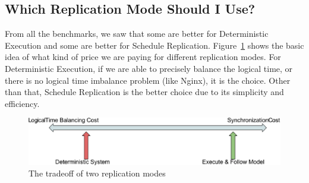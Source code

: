 \subsection{Which Replication Mode Should I Use?}
From all the benchmarks, we saw that some are better for Deterministic Execution and some are better for Schedule Replication. Figure~\ref{f:trade_off} shows the basic idea of what kind of price we are paying for different replication modes. For Deterministic Execution, if we are able to precisely balance the logical time, or there is no logical time imbalance problem (like Nginx), it is the choice. Other than that, Schedule Replication is the better choice due to its simplicity and efficiency.

\begin{figure}
\centering
\includegraphics[width=0.8\columnwidth]{figures/tradeoff}
\caption{The tradeoff of two replication modes}
\label{f:trade_off}
\end{figure}